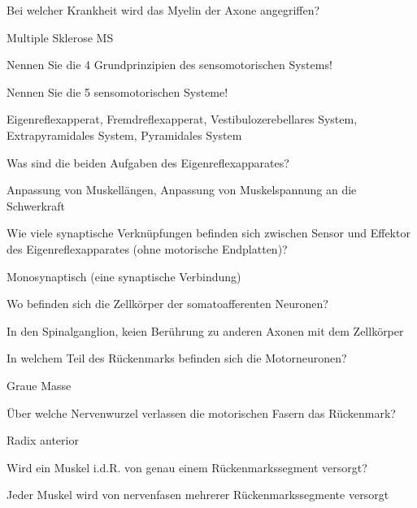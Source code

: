 \documentclass[10pt, a4paper]{exam}
\newcommand\Warning{%
 \makebox[1.4em][c]{%
 \makebox[0pt][c]{\raisebox{.1em}{\small!}}%
 \makebox[0pt][c]{\color{red}\Large$\bigtriangleup$}}}%
\begin{document}
\begin{questions}
  \question Bei welcher Krankheit wird das Myelin der Axone angegriffen?
  \begin{solution}
    Multiple Sklerose MS
  \end{solution}

  \question Nennen Sie die 4 Grundprinzipien des sensomotorischen Systems!
  \begin{solution}

  \end{solution}

  \question Nennen Sie die 5 sensomotorischen Systeme!
  \begin{solution}
    Eigenreflexapperat, Fremdreflexapperat, Vestibulozerebellares System, Extrapyramidales System, Pyramidales System
  \end{solution}

  \question Was sind die beiden Aufgaben des Eigenreflexapparates?
  \begin{solution}
    Anpassung von Muskellängen, Anpassung von Muskelspannung an die Schwerkraft
  \end{solution}

  \question Wie viele synaptische Verknüpfungen befinden sich zwischen Sensor und Effektor des Eigenreflexapparates (ohne motorische Endplatten)?
  \begin{solution}
    Monosynaptisch (eine synaptische Verbindung)
  \end{solution}

  \question Wo befinden sich die Zellkörper der somatoafferenten Neuronen?
  \begin{solution}
    In den Spinalganglion, keien Berührung zu anderen Axonen mit dem Zellkörper \Warning
  \end{solution}

  \question In welchem Teil des Rückenmarks befinden sich die Motorneuronen?
  \begin{solution}
    Graue Masse
  \end{solution}

  \question Über welche Nervenwurzel verlassen die motorischen Fasern das Rückenmark?
  \begin{solution}
    Radix anterior
  \end{solution}

  \question Wird ein Muskel i.d.R. von genau einem Rückenmarkssegment versorgt?
  \begin{solution}
    Jeder Muskel wird von nervenfasen mehrerer Rückenmarkssegmente versorgt
  \end{solution}


\end{questions}
\end{document}
